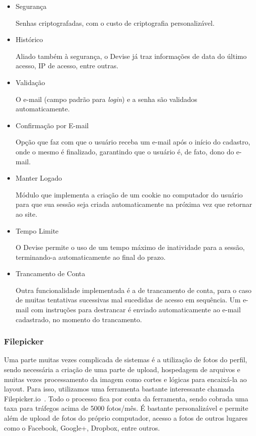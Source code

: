 \begin{itemize}
\item Segurança

Senhas criptografadas, com o custo de criptografia personalizável.

\item Histórico

Aliado também à segurança, o Devise já traz informações de data do último acesso, IP de acesso, entre outras.

\item Validação

O e-mail (campo padrão para \textit{login}) e a senha são validados automaticamente.

\item Confirmação por E-mail

Opção que faz com que o usuário receba um e-mail após o início do cadastro, onde o mesmo é finalizado, garantindo que o usuário é, de fato, dono do e-mail.

\item Manter Logado

Módulo que implementa a criação de um cookie no computador do usuário para que sua sessão seja criada automaticamente na próxima vez que retornar ao site.

\item Tempo Limite

O Devise permite o uso de um tempo máximo de inatividade para a sessão, terminando-a automaticamente ao final do prazo.

\item Trancamento de Conta

Outra funcionalidade implementada é a de trancamento de conta, para o caso de muitas tentativas sucessivas mal sucedidas de acesso em sequência. Um e-mail com instruções para destrancar é enviado automaticamente ao e-mail cadastrado, no momento do trancamento.
\end{itemize}

\subsubsection{Filepicker}

Uma parte muitas vezes complicada de sistemas é a utilização de fotos do perfil, sendo necessária a criação de uma parte de upload, hospedagem de arquivos e muitas vezes processamento da imagem como cortes e lógicas para encaixá-la ao layout. Para isso, utilizamos uma ferramenta bastante interessante chamada Filepicker.io~\cite{filepicker}. Todo o processo fica por conta da ferramenta, sendo cobrada uma taxa para tráfegos acima de 5000 fotos/mês. É bastante personalizável e permite além de upload de fotos do próprio computador, acesso a fotos de outros lugares como o Facebook, Google+, Dropbox, entre outros.

